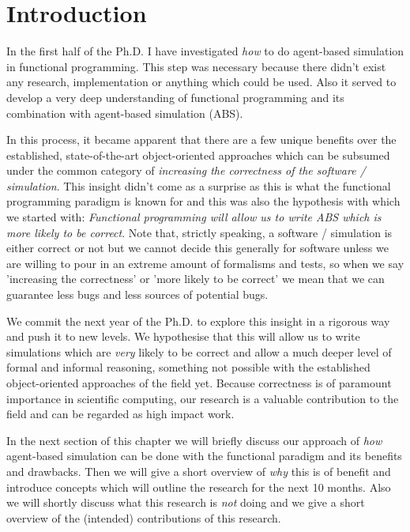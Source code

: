 \chapter{Introduction}
\label{chap:intro}
In the first half of the Ph.D. I have investigated \textit{how} to do agent-based simulation in functional programming. This step was necessary because there didn't exist any research, implementation or anything which could be used. Also it served to develop a very deep understanding of functional programming and its combination with agent-based simulation (ABS).

In this process, it became apparent that there are a few unique benefits over the established, state-of-the-art object-oriented approaches which can be subsumed under the common category of \textit{increasing the correctness of the software / simulation}. This insight didn't come as a surprise as this is what the functional programming paradigm is known for and this was also the hypothesis with which we started with: \textit{Functional programming will allow us to write ABS which is more likely to be correct}. Note that, strictly speaking, a software / simulation is either correct or not but we cannot decide this generally for software unless we are willing to pour in an extreme amount of formalisms and tests, so when we say 'increasing the correctness' or 'more likely to be correct' we mean that we can guarantee less bugs and less sources of potential bugs.

We commit the next year of the Ph.D. to explore this insight in a rigorous way and push it to new levels. We hypothesise that this will allow us to write simulations which are \textit{very} likely to be correct and allow a much deeper level of formal and informal reasoning, something not possible with the established object-oriented approaches of the field yet. Because correctness is of paramount importance in scientific computing, our research is a valuable contribution to the field and can be regarded as high impact work.

In the next section of this chapter we will briefly discuss our approach of \textit{how} agent-based simulation can be done with the functional paradigm and its benefits and drawbacks. Then we will give a short overview of \textit{why} this is of benefit and introduce concepts which will outline the research for the next 10 months. Also we will shortly discuss what this research is \textit{not} doing and we give a short overview of the (intended) contributions of this research. 

